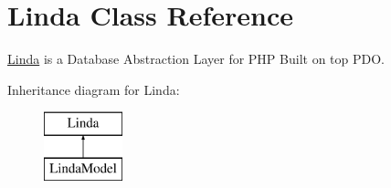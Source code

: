\hypertarget{class_linda}{}\section{Linda Class Reference}
\label{class_linda}


\hyperlink{class_linda}{Linda} is a Database Abstraction Layer for P\+H\+P Built on top P\+D\+O.  


Inheritance diagram for Linda\+:\begin{figure}[H]
\begin{center}
\leavevmode
\includegraphics[height=2.000000cm]{class_linda}
\end{center}
\end{figure}
